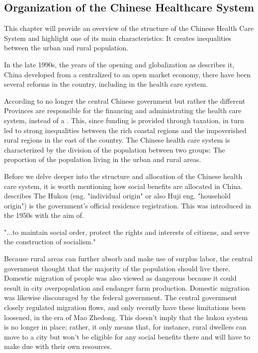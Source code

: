 \documentclass[
]{article}
\begin{document}
\subsection{Organization of the Chinese Healthcare System}
This chapter will provide an overview of the structure of the Chinese Health Care System and highlight one of its main characteristics: It creates inequalities between the urban and rural population. 

In the late 1990s, the years of the opening and globalization as \textcite{kanbur_fifty_2005} describes it, China developed from a centralized to an open market economy, there have been several reforms in the country, including in the health care system. 

According to \textcite{hougaard_chinese_2011} no longer the central Chinese government but rather the different Provinces are responsible for the financing and administrating the health care system, instead of a . This, since funding is provided through taxation, in turn led to strong inequalities between the rich coastal regions and the impoverished rural regions in the east of the country. The Chinese health care system is characterized by the division of the population between two groups: The proportion of the population living in the urban and rural areas. 

Before we delve deeper into the structure and allocation of the Chinese health care system, it is worth mentioning how social benefits are allocated in China. \cite{liu_institution_2005} describes The Hukou (eng. "individual origin" or also Huji eng. "household origin") is the government's official residence registration. This was introduced in the 1950s with the aim of. 

"...to maintain social order, protect the rights and interests of citizens, and serve the construction of socialism."

Because rural areas can further absorb and make use of surplus labor, the central government thought that the majority of the population should live there.
Domestic migration of people was also viewed as dangerous because it could result in city overpopulation and endanger farm production.
Domestic migration was likewise discouraged by the federal government.
The central government closely regulated migration flows, and only recently have these limitations been loosened, in the era of Mao Zhedong. This doesn't imply that the hukou system is no longer in place; rather, it only means that, for instance, rural dwellers can move to a city but won't be eligible for any social benefits there and will have to make due with their own resources.
\end{document}
